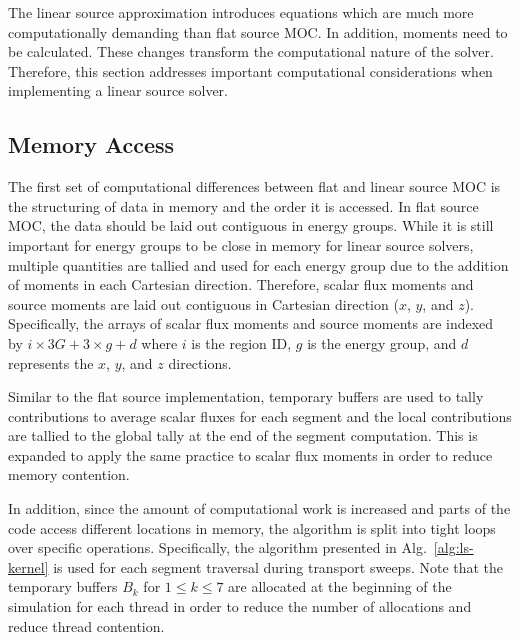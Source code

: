 The linear source approximation introduces equations which are much more computationally demanding than flat source \ac{MOC}. In addition, moments need to be calculated. These changes transform the computational nature of the solver. Therefore, this section addresses important computational considerations when implementing a linear source solver.

\subsection{Memory Access}

The first set of computational differences between flat and linear source \ac{MOC} is the structuring of data in memory and the order it is accessed. In flat source \ac{MOC}, the data should be laid out contiguous in energy groups. While it is still important for energy groups to be close in memory for linear source solvers, multiple quantities are tallied and used for each energy group due to the addition of moments in each Cartesian direction. Therefore, scalar flux moments and source moments are laid out contiguous in Cartesian direction ($x$, $y$, and $z$). Specifically, the arrays of scalar flux moments and source moments are indexed by $i\times 3G + 3\times g + d$ where $i$ is the region ID, $g$ is the energy group, and $d$ represents the $x$, $y$, and $z$ directions.

Similar to the flat source implementation, temporary buffers are used to tally contributions to average scalar fluxes for each segment and the local contributions are tallied to the global tally at the end of the segment computation. This is expanded to apply the same practice to scalar flux moments in order to reduce memory contention.

In addition, since the amount of computational work is increased and parts of the code access different locations in memory, the algorithm is split into tight loops over specific operations. Specifically, the algorithm presented in Alg.~\ref{alg:ls-kernel} is used for each segment traversal during transport sweeps. Note that the temporary buffers $B_k$ for $1 \leq k \leq 7$ are allocated at the beginning of the simulation for each thread in order to reduce the number of allocations and reduce thread contention.

